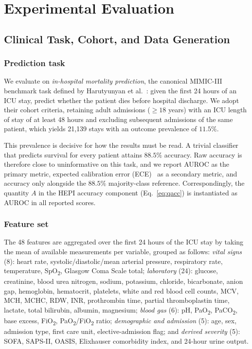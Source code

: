 \documentclass[journal,compsoc]{IEEEtran}
\newcommand{\HEPI}{\textsc{HEPI}}          %
\begin{document}
\section{Experimental Evaluation}
\label{sec:eval}

\subsection{Clinical Task, Cohort, and Data Generation}
\label{sec:datagen}

\subsubsection{Prediction task}

We evaluate on \emph{in-hospital mortality prediction}, the canonical MIMIC-III
benchmark task defined by Harutyunyan et al.~\cite{harutyunyan2019multitask}:
given the first 24 hours of an ICU stay, predict whether the patient dies
before hospital discharge. We adopt their cohort criteria, retaining adult
admissions ($\geq 18$ years) with an ICU length of stay of at least 48 hours
and excluding subsequent admissions of the same patient, which yields 21{,}139
stays with an outcome prevalence of $11.5\%$.

This prevalence is decisive for how the results must be read. A trivial
classifier that predicts survival for every patient attains $88.5\%$ accuracy.
Raw accuracy is therefore close to uninformative on this task, and we report
AUROC as the primary metric, expected calibration error
(ECE)~\cite{guo2017calibration} as a secondary metric, and accuracy only
alongside the $88.5\%$ majority-class reference. Correspondingly, the quantity
$A$ in the \HEPI{} accuracy component (Eq.~\eqref{eq:qacc}) is instantiated as
AUROC in all reported scores.

\subsubsection{Feature set}

The 48 features are aggregated over the first 24 hours of the ICU stay by
taking the mean of available measurements per variable, grouped as follows:
\emph{vital signs} (8): heart rate, systolic/diastolic/mean arterial pressure,
respiratory rate, temperature, SpO\textsubscript{2}, Glasgow Coma Scale total;
\emph{laboratory} (24): glucose, creatinine, blood urea nitrogen, sodium,
potassium, chloride, bicarbonate, anion gap, hemoglobin, hematocrit, platelets,
white and red blood cell counts, MCV, MCH, MCHC, RDW, INR, prothrombin time,
partial thromboplastin time, lactate, total bilirubin, albumin, magnesium;
\emph{blood gas} (6): pH, PaO\textsubscript{2}, PaCO\textsubscript{2}, base
excess, FiO\textsubscript{2}, PaO\textsubscript{2}/FiO\textsubscript{2} ratio;
\emph{demographic and admission} (5): age, sex, admission type, first care
unit, elective-admission flag; and \emph{derived severity} (5): SOFA, SAPS-II,
OASIS, Elixhauser comorbidity index, and 24-hour urine output.
\end{document}
